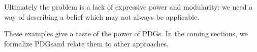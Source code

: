 \documentclass{article}
\newcommand{\MN}{PDG}
\newcommand{\MNs}{\MN s}
\numberwithin{equation}{section}
\begin{document}
\begin{notfocus}
\begin{vfull}
\begin{example}
	
		
		
		Ultimately the problem is a lack of expressive power and modularity: we need a way of describing a belief which may not always be applicable. 		
		
		

	\end{example}
	\end{vfull}

These examples give a taste of the power of \MNs.  In the coming
sections, we formalize \MNs and relate them to other approaches.		




\end{notfocus}
\end{document}
